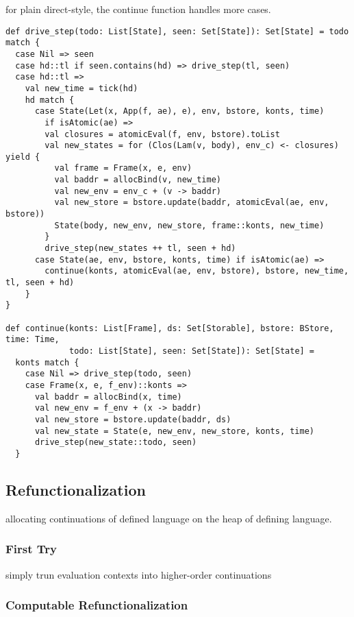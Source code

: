\documentclass[acmsmall,review,anonymous]{acmart}\settopmatter{printfolios=true,printccs=false,printacmref=false}
\begin{document}
for plain direct-style, the continue function handles more cases.

\begin{verbatim}
def drive_step(todo: List[State], seen: Set[State]): Set[State] = todo match {
  case Nil => seen
  case hd::tl if seen.contains(hd) => drive_step(tl, seen)
  case hd::tl =>
    val new_time = tick(hd)
    hd match {
      case State(Let(x, App(f, ae), e), env, bstore, konts, time)
        if isAtomic(ae) =>
        val closures = atomicEval(f, env, bstore).toList
        val new_states = for (Clos(Lam(v, body), env_c) <- closures) yield {
          val frame = Frame(x, e, env)
          val baddr = allocBind(v, new_time)
          val new_env = env_c + (v -> baddr)
          val new_store = bstore.update(baddr, atomicEval(ae, env, bstore))
          State(body, new_env, new_store, frame::konts, new_time)
        }
        drive_step(new_states ++ tl, seen + hd)
      case State(ae, env, bstore, konts, time) if isAtomic(ae) =>
        continue(konts, atomicEval(ae, env, bstore), bstore, new_time, tl, seen + hd)
    }
}

def continue(konts: List[Frame], ds: Set[Storable], bstore: BStore, time: Time, 
             todo: List[State], seen: Set[State]): Set[State] = 
  konts match {
    case Nil => drive_step(todo, seen)
    case Frame(x, e, f_env)::konts =>
      val baddr = allocBind(x, time)
      val new_env = f_env + (x -> baddr)
      val new_store = bstore.update(baddr, ds)
      val new_state = State(e, new_env, new_store, konts, time)
      drive_step(new_state::todo, seen)
  }
\end{verbatim}

\subsection{Refunctionalization}

allocating continuations of defined language on the heap of defining language.

\subsubsection{First Try}

simply trun evaluation contexts into higher-order continuations

\subsubsection{Computable Refunctionalization}
\end{document}

